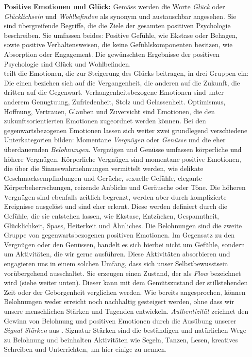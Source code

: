 \par
\textbf{Positive Emotionen und Glück:} 
Gemäss  werden die Worte \textit{Glück} oder \textit{Glücklichsein} und \textit{Wohlbefinden} als synonym und austauschbar angesehen. Sie sind übergreifende Begriffe, die die Ziele der gesamten positiven Psychologie beschreiben. Sie umfassen beides: Positive Gefühle, wie Ekstase oder Behagen, sowie positive Verhaltensweisen, die keine Gefühlskomponenten besitzen, wie Absorption oder Engagement. Die gewünschten Ergebnisse der positiven Psychologie sind Glück und Wohlbefinden.\\
 teilt die Emotionen, die zur Steigerung des Glücks beitragen, in drei Gruppen ein: Die einen beziehen sich auf die Vergangenheit, die anderen auf die Zukunft, die dritten auf die Gegenwart. Verhangenheitsbezogene Emotionen sind unter anderem Genugtuung, Zufriedenheit, Stolz und Gelassenheit. Optimismus, Hoffnung, Vertrauen, Glauben und Zuversicht sind Emotionen, die den zukunftsorientierten Emotionen zugeordnet werden können. Bei den gegenwartsbezogenen Emotionen lassen sich weiter zwei grundlegend verschiedene Unterkategorien bilden: Momentane \textit{Vergnügen} oder \textit{Genüsse} und die eher überdauernden \textit{Belohnungen}. Vergnügen und Genüsse umfassen körperliche und höhere Vergnügen. Körperliche Vergnügen sind momentane positive Emotionen, die über die Sinneswahrnehmungen vermittelt werden, wie delikate Geschmacksempfindungen und Gerüche, sexuelle Gefühle, elegante Körperbeherrschungen, reizende Anblicke und Geräusche oder Töne. Die höheren Vergnügen sind ebenfalls zeitlich begrenzt, werden aber durch komplizierte Ereignisse ausgelöst und sind eher erlernt. Diese werden definiert durch die Gefühle, die sie entstehen lassen, wie Ekstase, Entzücken, Gespanntheit, Glücklichkeit, Spass, Heiterkeit und Ähnliches. Die Belohnungen sind die zweite Gruppe von gegenwartsbezogenen positiven Emotionen. Im Gegensatz zu den Vergnügen oder den Genüssen, handelt es sich hierbei nicht um Gefühle, sondern um Aktivitäten, die wir gerne ausführen. Diese Aktivitäten absorbieren und engagieren uns in einem solchen Umfang, dass sich unser Selbstbewusstsein vorübergehend ausschaltet. Sie erzeugen einen Zustand, der als \textit{Flow} bezeichnet wird (siehe weiter unten). Dieser kann mit dem Gemütszustand der stillstehenden Zeit oder der Geborgenheit verglichen werden. Wie bereits angesprochen, können Belohnungen weder erreicht noch nachhaltig gesteigert werden, ohne dass wir unsere menschlichen Stärken und Tugenden entwickeln. \textit{Authentizität} zeichnet den Gewinn von Belohnung und positiven Emotionen durch die Ausübung unserer \textit{Signal-Stärken} aus \cite{Seligman2003}. Signatur-Stärken sind die beständigen und natürlichen Wege zu Belohnung und beinhalten Aktivitäten wie Segeln, Tanzen, Lesen, kreatives Schreiben und Unterrichten, um hier einige zu nennen.
